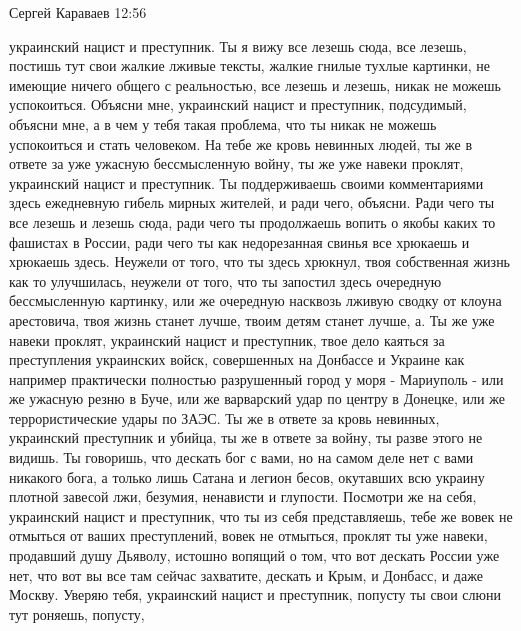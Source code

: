  
 
 
 
 

Сергей Караваев
12:56

украинский нацист и преступник. Ты я вижу все лезешь сюда, все лезешь, постишь
тут свои жалкие лживые тексты, жалкие гнилые тухлые картинки, не имеющие ничего
общего с реальностью, все лезешь и лезешь, никак не можешь успокоиться. Объясни
мне, украинский нацист и преступник, подсудимый, объясни мне, а в чем у тебя
такая проблема, что ты никак не можешь успокоиться и стать человеком. На тебе
же кровь невинных людей, ты же в ответе за уже ужасную бессмысленную войну, ты
же уже навеки проклят, украинский нацист и преступник. Ты поддерживаешь своими
комментариями здесь ежедневную гибель мирных жителей, и ради чего, объясни.
Ради чего ты все лезешь и лезешь сюда, ради чего ты продолжаешь вопить о якобы
каких то фашистах в России, ради чего ты как недорезанная свинья все хрюкаешь и
хрюкаешь здесь. Неужели от того, что ты здесь хрюкнул, твоя собственная жизнь
как то улучшилась, неужели от того, что ты запостил здесь очередную
бессмысленную картинку, или же очередную насквозь лживую сводку от клоуна
арестовича, твоя жизнь станет лучше, твоим детям станет лучше, а. Ты же уже
навеки проклят, украинский нацист и преступник, твое дело каяться за
преступления украинских войск, совершенных на Донбассе и Украине как например
практически полностью разрушенный город у моря - Мариуполь - или же ужасную
резню в Буче, или же варварский удар по центру в Донецке, или же
террористические удары по ЗАЭС. Ты же в ответе за кровь невинных, украинский
преступник и убийца, ты же в ответе за войну, ты разве этого не видишь. Ты
говоришь, что дескать бог с вами, но на самом деле нет с вами никакого бога, а
только лишь Сатана и легион бесов, окутавших всю украину плотной завесой лжи,
безумия, ненависти и глупости. Посмотри же на себя, украинский нацист и
преступник, что ты из себя представляешь, тебе же вовек не отмыться от ваших
преступлений, вовек не отмыться, проклят ты уже навеки, продавший душу Дьяволу,
истошно вопящий о том, что вот дескать России уже нет, что вот вы все там
сейчас захватите, дескать и Крым, и Донбасс, и даже Москву. Уверяю тебя,
украинский нацист и преступник, попусту ты свои слюни тут роняешь, попусту,
